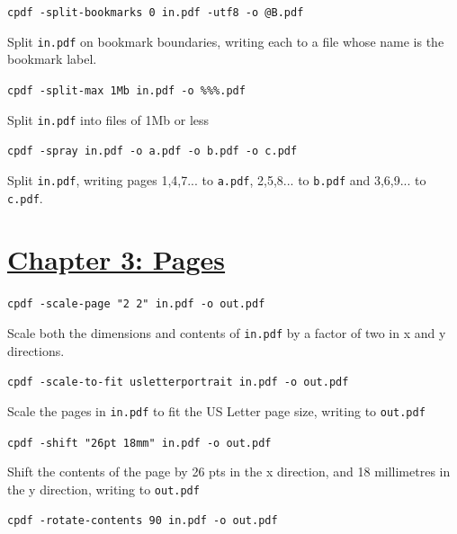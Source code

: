 \documentclass{book}
\begin{document}
\begin{framed}\noindent\texttt{cpdf -split-bookmarks 0 in.pdf -utf8 -o @B.pdf}\end{framed}

\noindent Split \texttt{in.pdf} on bookmark boundaries, writing each to a file whose name is the bookmark label.

\begin{framed}\noindent\texttt{cpdf -split-max 1Mb in.pdf -o \%\%\%.pdf}\end{framed}

\noindent Split \texttt{in.pdf} into files of 1Mb or less

\begin{framed}\noindent\texttt{cpdf -spray in.pdf -o a.pdf -o b.pdf -o c.pdf}\end{framed}

\noindent Split \texttt{in.pdf}, writing pages 1,4,7... to \texttt{a.pdf}, 2,5,8... to \texttt{b.pdf} and 3,6,9... to \texttt{c.pdf}.

\section*{\hyperref[chap:3]{Chapter 3: Pages}}

\begin{framed}\noindent\texttt{cpdf -scale-page "2 2" in.pdf -o out.pdf}\end{framed}

\noindent Scale both the dimensions and contents of \texttt{in.pdf} by a factor of two in x and y directions.

\begin{framed}\noindent\texttt{cpdf -scale-to-fit usletterportrait in.pdf -o out.pdf}\end{framed}

\noindent Scale the pages in \texttt{in.pdf} to fit the US Letter page size, writing to \texttt{out.pdf}

\begin{framed}\noindent\texttt{cpdf -shift "26pt 18mm" in.pdf -o out.pdf}\end{framed}

\noindent Shift the contents of the page by 26 pts in the x direction, and 18 millimetres in the y direction, writing to \texttt{out.pdf}

\begin{framed}\noindent\texttt{cpdf -rotate-contents 90 in.pdf -o out.pdf}\end{framed}
\end{document}
